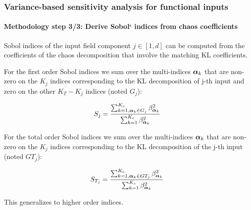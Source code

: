 \documentclass[aspectratio=169]{beamer}
\begin{document}
\begin{frame}
\frametitle{Variance-based sensitivity analysis for functional inputs}

\framesubtitle{Methodology step 3/3: Derive Sobol` indices from chaos coefficients}

Sobol indices of the input field component $j \in [1,d]$ can be computed
from the coefficients of the chaos decomposition that involve the
matching KL coefficients.

For the first order Sobol indices we sum over the multi-indices ${\mathbf{\boldsymbol{{\alpha}}}}_k$
that are non-zero on the $K_j$ indices corresponding to the KL
decomposition of j-th input and zero on the other $K_T - K_j$ indices (noted $G_j$):

$$
S_j = \frac{\sum_{k=1, {\mathbf{\boldsymbol{{\alpha}}}}_k \in G_j}^{K_c} \beta_{{\mathbf{\boldsymbol{{\alpha}}}}_k}^2}{\sum_{k=1}^{K_c} \beta_{{\mathbf{\boldsymbol{{\alpha}}}}_k}^2}
$$

For the total order Sobol indices we sum over the multi-indices ${\mathbf{\boldsymbol{{\alpha}}}}_k$
that are non-zero on the $K_j$ indices corresponding to the KL
decomposition of the j-th input (noted $GT_j$):

$$
S_{T_j} = \frac{\sum_{k=1, {\mathbf{\boldsymbol{{\alpha}}}}_k \in GT_j}^{K_c} \beta_{{\mathbf{\boldsymbol{{\alpha}}}}_k}^2}{\sum_{k=1}^{K_c} \beta_{{\mathbf{\boldsymbol{{\alpha}}}}_k}^2} 
$$

This generalizes to higher order indices.

\end{frame}
\end{document}
